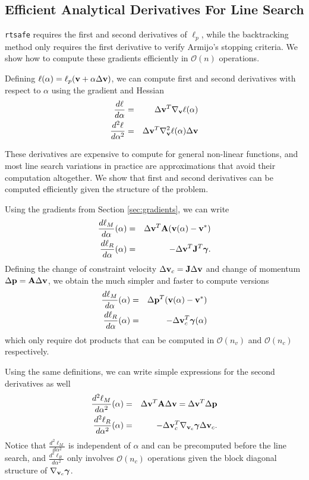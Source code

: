\subsection{Efficient Analytical Derivatives For Line Search}

\verb;rtsafe; requires the first and second derivatives of $\ell_p$, while the
backtracking method only requires the first derivative to verify Armijo's
stopping criteria. We show how to compute these gradients efficiently in
$\mathcal{O}(n)$ operations.

Defining $\ell(\alpha) = \ell_p({\mathbf{v}}+\alpha\Delta{\mathbf{v}})$, we can compute first
and second derivatives with respect to $\alpha$ using the gradient and Hessian
\begin{eqnarray}
	\frac{d\ell}{d\alpha}&=&\Delta{\mathbf{v}}^T\nabla_{\mathbf{v}}\ell(\alpha)\nonumber\\
	\frac{d^2\ell}{d\alpha^2}&=&\Delta{\mathbf{v}}^T\nabla_{\mathbf{v}}^2\ell(\alpha)\Delta{\mathbf{v}}\nonumber
\end{eqnarray}

These derivatives are expensive to compute for general non-linear functions, and
most line search variations in practice are approximations that avoid their
computation altogether. We show that first and second derivatives can be
computed efficiently given the structure of the problem.

Using the gradients from Section \ref{sec:gradients}, we can write
\begin{eqnarray}
	\frac{d\ell_M}{d\alpha}(\alpha)&=&\Delta{\mathbf{v}}^T{\mathbf{A}}({\mathbf{v}}(\alpha)-{\mathbf{v}}^*)\\
	\frac{d\ell_R}{d\alpha}(\alpha)&=&-\Delta{\mathbf{v}}^T{\mathbf{J}}^T{\bm\gamma}.
\end{eqnarray}
Defining the change of constraint velocity
$\Delta{\mathbf{v}}_c={\mathbf{J}}\Delta{\mathbf{v}}$ and change of momentum $\Delta{\mathbf{p}} =
{\mathbf{A}}\Delta{\mathbf{v}}$, we obtain the much simpler and faster to compute versions
\begin{eqnarray}
	\frac{d\ell_M}{d\alpha}(\alpha)&=&\Delta{\mathbf{p}}^T({\mathbf{v}}(\alpha)-{\mathbf{v}}^*)\\
	\frac{d\ell_R}{d\alpha}(\alpha)&=&-\Delta{\mathbf{v}}_c^T{\bm\gamma}(\alpha)
\end{eqnarray}
which only require dot products that can be computed in $\mathcal{O}(n_v)$ and
$\mathcal{O}(n_c)$ respectively.

Using the same definitions, we can write simple expressions for the second
derivatives as well
\begin{eqnarray}
	\frac{d^2\ell_M}{d\alpha^2}(\alpha)&=&\Delta{\mathbf{v}}^T{\mathbf{A}}\Delta{\mathbf{v}}=\Delta{\mathbf{v}}^T\Delta{\mathbf{p}}\\
	\frac{d^2\ell_R}{d\alpha^2}(\alpha)&=&-\Delta{\mathbf{v}}_c^T
	\nabla_{{\mathbf{v}}_c}{\bm\gamma}\Delta{\mathbf{v}}_c.
\end{eqnarray}
Notice that $\frac{d^2\ell_M}{d\alpha^2}$ is independent of $\alpha$ and
can be precomputed before the line search, and
$\frac{d^2\ell_R}{d\alpha^2}$ only involves $\mathcal{O}(n_c)$ operations given
the block diagonal structure of $\nabla_{{\mathbf{v}}_c}{\bm\gamma}$.

